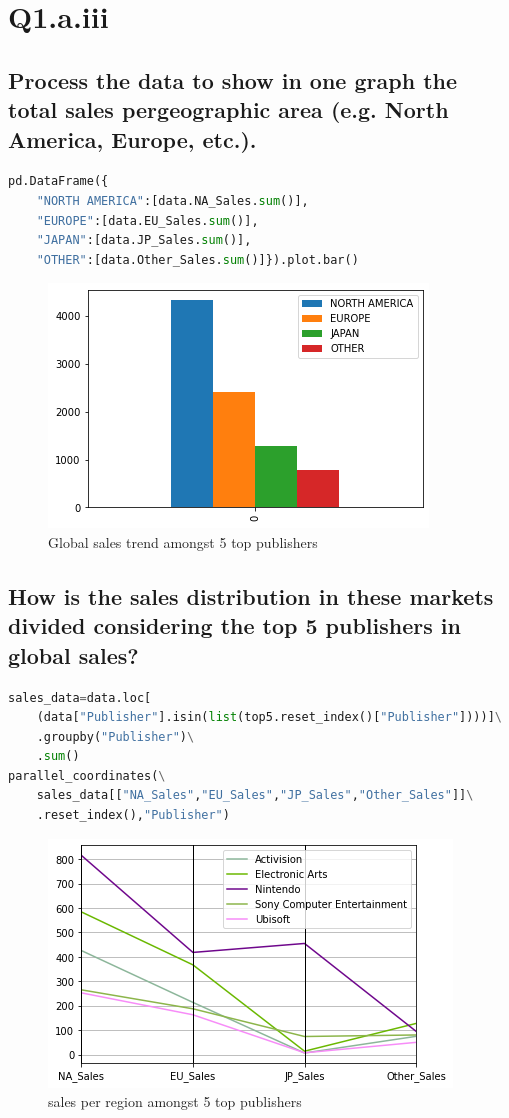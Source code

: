 \documentclass[openany]{article}
\begin{document}
	\section{Q1.a.iii}
		\subsection{Process the data to show in one graph the total sales pergeographic area (e.g. North America, Europe, etc.).}
			\begin{lstlisting}[language=Python]
pd.DataFrame({
	"NORTH AMERICA":[data.NA_Sales.sum()],
	"EUROPE":[data.EU_Sales.sum()],
	"JAPAN":[data.JP_Sales.sum()],
	"OTHER":[data.Other_Sales.sum()]}).plot.bar()
			\end{lstlisting}
			\begin{figure}[H]
				\iftrue
				\centering
				\caption{Global sales trend amongst 5 top publishers}
				\includegraphics[scale=0.5]{sum-sales-per-region}
				\fi
			\end{figure}	
		\subsection{How is the sales distribution in these markets divided considering the top 5 publishers in global sales?}
			\begin{lstlisting}[language=Python]
sales_data=data.loc[
	(data["Publisher"].isin(list(top5.reset_index()["Publisher"])))]\
	.groupby("Publisher")\
	.sum()
parallel_coordinates(\
	sales_data[["NA_Sales","EU_Sales","JP_Sales","Other_Sales"]]\
	.reset_index(),"Publisher")

			\end{lstlisting}
			\begin{figure}[H]
				\iftrue
				\centering
				\caption{sales per region amongst 5 top publishers}
				\includegraphics[scale=0.5]{top5-sales-per-region-par}
				\fi
			\end{figure}
\end{document}
